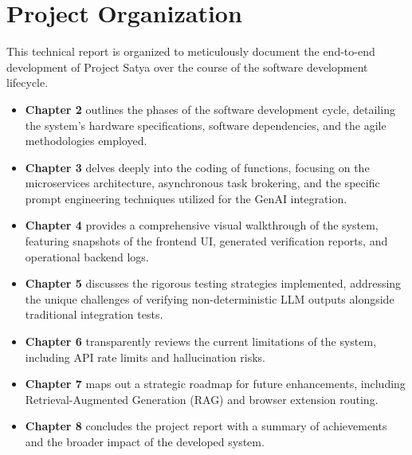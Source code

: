 \section{Project Organization}
This technical report is organized to meticulously document the end-to-end development of Project Satya over the course of the software development lifecycle. 

\begin{itemize}
    \item \textbf{Chapter 2} outlines the phases of the software development cycle, detailing the system's hardware specifications, software dependencies, and the agile methodologies employed.
    \item \textbf{Chapter 3} delves deeply into the coding of functions, focusing on the microservices architecture, asynchronous task brokering, and the specific prompt engineering techniques utilized for the GenAI integration.
    \item \textbf{Chapter 4} provides a comprehensive visual walkthrough of the system, featuring snapshots of the frontend UI, generated verification reports, and operational backend logs.
    \item \textbf{Chapter 5} discusses the rigorous testing strategies implemented, addressing the unique challenges of verifying non-deterministic LLM outputs alongside traditional integration tests.
    \item \textbf{Chapter 6} transparently reviews the current limitations of the system, including API rate limits and hallucination risks.
    \item \textbf{Chapter 7} maps out a strategic roadmap for future enhancements, including Retrieval-Augmented Generation (RAG) and browser extension routing.
    \item \textbf{Chapter 8} concludes the project report with a summary of achievements and the broader impact of the developed system.
\end{itemize}
